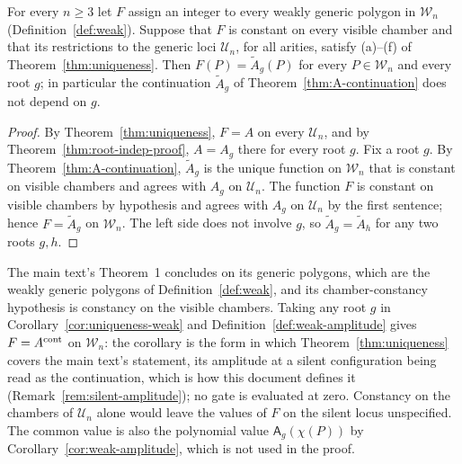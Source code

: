 \begin{corollary}\label{cor:uniqueness-weak}
For every $n\geq3$ let $F$ assign an integer to every weakly generic polygon
in $\mathcal W_n$ (Definition~\ref{def:weak}). Suppose that $F$ is constant on
every visible chamber and that its restrictions to the generic loci
$\mathcal U_n$, for all arities, satisfy (a)--(f) of
Theorem~\ref{thm:uniqueness}. Then $F(P)=\widetilde A_g(P)$ for every
$P\in\mathcal W_n$ and every root $g$; in particular the continuation
$\widetilde A_g$ of Theorem~\ref{thm:A-continuation} does not depend on $g$.
\end{corollary}
\begin{proof}
By Theorem~\ref{thm:uniqueness}, $F=A$ on every $\mathcal U_n$, and by
Theorem~\ref{thm:root-indep-proof}, $A=A_g$ there for every root $g$. Fix a
root $g$. By Theorem~\ref{thm:A-continuation}, $\widetilde A_g$ is the unique
function on $\mathcal W_n$ that is constant on visible chambers and agrees
with $A_g$ on $\mathcal U_n$. The function $F$ is constant on visible chambers
by hypothesis and agrees with $A_g$ on $\mathcal U_n$ by the first sentence;
hence $F=\widetilde A_g$ on $\mathcal W_n$. The left side does not involve
$g$, so $\widetilde A_g=\widetilde A_h$ for any two roots $g,h$.
\end{proof}

\begin{remark}
The main text's Theorem~1 concludes on its generic polygons, which are the
weakly generic polygons of Definition~\ref{def:weak}, and its
chamber-constancy hypothesis is constancy on the visible chambers. Taking
any root $g$ in Corollary~\ref{cor:uniqueness-weak} and
Definition~\ref{def:weak-amplitude} gives $F=A^{\rm cont}$ on
$\mathcal W_n$: the corollary is the form in which
Theorem~\ref{thm:uniqueness} covers the main text's statement, its
amplitude at a silent configuration being read as the continuation, which
is how this document defines it (Remark~\ref{rem:silent-amplitude}); no
gate is evaluated at zero. Constancy on the chambers of $\mathcal U_n$
alone would leave the values of $F$ on the silent locus unspecified. The
common value is also the polynomial value $\mathsf A_g(\chi(P))$ by
Corollary~\ref{cor:weak-amplitude}, which is not used in the proof.
\end{remark}

